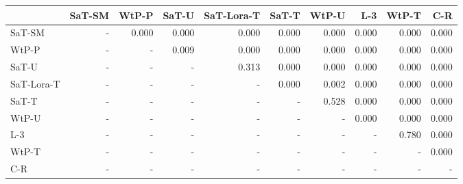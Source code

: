 \begin{tabular}{lrrrrrrrrr}
\toprule
 & SaT-SM & WtP-P & SaT-U & SaT-Lora-T & SaT-T & WtP-U & L-3 & WtP-T & C-R \\
\midrule
SaT-SM & - & 0.000 & 0.000 & 0.000 & 0.000 & 0.000 & 0.000 & 0.000 & 0.000 \\
WtP-P & - & - & 0.009 & 0.000 & 0.000 & 0.000 & 0.000 & 0.000 & 0.000 \\
SaT-U & - & - & - & 0.313 & 0.000 & 0.000 & 0.000 & 0.000 & 0.000 \\
SaT-Lora-T & - & - & - & - & 0.000 & 0.002 & 0.000 & 0.000 & 0.000 \\
SaT-T & - & - & - & - & - & 0.528 & 0.000 & 0.000 & 0.000 \\
WtP-U & - & - & - & - & - & - & 0.000 & 0.000 & 0.000 \\
L-3 & - & - & - & - & - & - & - & 0.780 & 0.000 \\
WtP-T & - & - & - & - & - & - & - & - & 0.000 \\
C-R & - & - & - & - & - & - & - & - & - \\
\bottomrule
\end{tabular}

